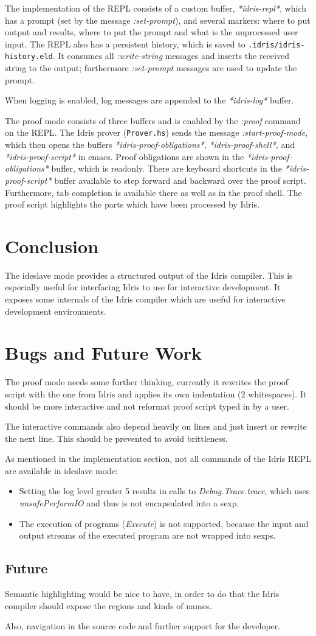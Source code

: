 \documentclass{article}
\begin{document}
The implementation of the REPL consists of a custom buffer, \emph{*idris-repl*}, which has a prompt (set by the message \emph{:set-prompt}), and several markers: where to put output and results, where to put the prompt and what is the unprocessed user input.
The REPL also has a persistent history, which is saved to \texttt{.idris/idris-history.eld}.
It consumes all \emph{:write-string} messages and inserts the received string to the output; furthermore \emph{:set-prompt} messages are used to update the prompt.

When logging is enabled, log messages are appended to the \emph{*idris-log*} buffer.

The proof mode consists of three buffers and is enabled by the \emph{:proof} command on the REPL.
The Idris prover (\texttt{Prover.hs}) sends the message \emph{:start-proof-mode}, which then opens the buffers \emph{*idris-proof-obligations*}, \emph{*idris-proof-shell*}, and \emph{*idris-proof-script*} in emacs.
Proof obligations are shown in the \emph{*idris-proof-obligations*} buffer, which is readonly.
There are keyboard shortcuts in the \emph{*idris-proof-script*} buffer available to step forward and backward over the proof script.
Furthermore, tab completion is available there as well as in the proof shell.
The proof script highlights the parts which have been processed by Idris.

\section{Conclusion}
The ideslave mode provides a structured output of the Idris compiler.
This is especially useful for interfacing Idris to use for interactive development.
It exposes some internals of the Idris compiler which are useful for interactive development environments.

\section{Bugs and Future Work}
The proof mode needs some further thinking, currently it rewrites the proof script with the one from Idris and applies its own indentation (2 whitespaces).
It should be more interactive and not reformat proof script typed in by a user.

The interactive commands also depend heavily on lines and just insert or rewrite the next line.
This should be prevented to avoid brittleness.

As mentioned in the implementation section, not all commands of the Idris REPL are available in ideslave mode:
\begin{itemize}
\item Setting the log level greater 5 results in calls to \emph{Debug.Trace.trace}, which uses \emph{unsafePerformIO} and thus is not encapsulated into a sexp.
\item The execution of programs (\emph{Execute}) is not supported, because the input and output streams of the executed program are not wrapped into sexps.
\end{itemize}

\subsection{Future}
Semantic highlighting would be nice to have, in order to do that the Idris compiler should expose the regions and kinds of names.

Also, navigation in the source code and further support for the developer.
\end{document}
